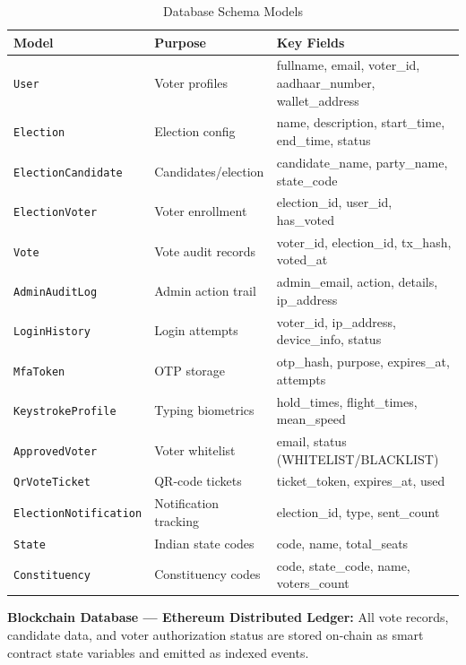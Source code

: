 \documentclass[oneside,a4paper,12pt]{book}
\begin{document}
\begin{table}[htbp]
\centering
\renewcommand{\arraystretch}{1.2}
\small
\begin{tabularx}{\textwidth}{|p{3.5cm}|p{3.5cm}|X|}
\hline
\textbf{Model} & \textbf{Purpose} & \textbf{Key Fields} \\
\hline
\texttt{User} & Voter profiles & fullname, email, voter\_id, aadhaar\_number, wallet\_address \\
\hline
\texttt{Election} & Election config & name, description, start\_time, end\_time, status \\
\hline
\texttt{ElectionCandidate} & Candidates/election & candidate\_name, party\_name, state\_code \\
\hline
\texttt{ElectionVoter} & Voter enrollment & election\_id, user\_id, has\_voted \\
\hline
\texttt{Vote} & Vote audit records & voter\_id, election\_id, tx\_hash, voted\_at \\
\hline
\texttt{AdminAuditLog} & Admin action trail & admin\_email, action, details, ip\_address \\
\hline
\texttt{LoginHistory} & Login attempts & voter\_id, ip\_address, device\_info, status \\
\hline
\texttt{MfaToken} & OTP storage & otp\_hash, purpose, expires\_at, attempts \\
\hline
\texttt{KeystrokeProfile} & Typing biometrics & hold\_times, flight\_times, mean\_speed \\
\hline
\texttt{ApprovedVoter} & Voter whitelist & email, status (WHITELIST/BLACKLIST) \\
\hline
\texttt{QrVoteTicket} & QR-code tickets & ticket\_token, expires\_at, used \\
\hline
\texttt{ElectionNotification} & Notification tracking & election\_id, type, sent\_count \\
\hline
\texttt{State} & Indian state codes & code, name, total\_seats \\
\hline
\texttt{Constituency} & Constituency codes & code, state\_code, name, voters\_count \\
\hline
\end{tabularx}
\caption{Database Schema Models}
\label{tab:db_models}
\end{table}

\textbf{Blockchain Database --- Ethereum Distributed Ledger:} All vote records, candidate data, and voter authorization status are stored on-chain as smart contract state variables and emitted as indexed events.
\end{document}
